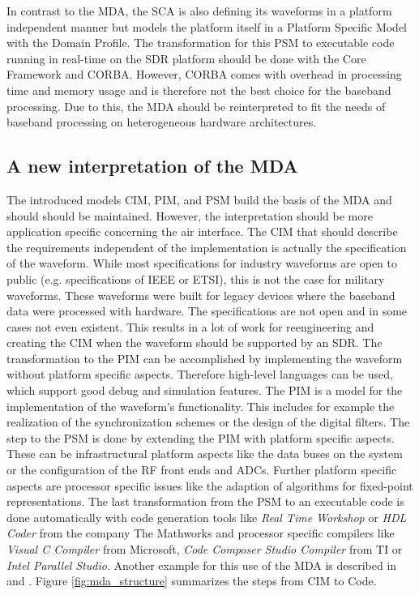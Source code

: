 In contrast to the \ac{MDA}, the \ac{SCA} is also defining its waveforms in a platform independent manner but models the platform itself in a Platform Specific Model with the Domain Profile. The transformation for this \ac{PSM} to executable code running in real-time on the SDR platform should be done with the Core Framework and \ac{CORBA}. However, \ac{CORBA} comes with overhead in processing time and memory usage and is therefore not the best choice for the baseband processing. Due to this, the MDA should be reinterpreted to fit the needs of baseband processing on heterogeneous hardware architectures.

\subsection{A new interpretation of the MDA} 
The introduced models \ac{CIM}, \ac{PIM}, and \ac{PSM} build the basis of the \ac{MDA} and should should be maintained. However, the interpretation should be more application specific concerning the air interface. The \ac{CIM} that should describe the requirements independent of the implementation is actually the specification of the waveform. While most specifications for industry waveforms are open to public (e.g. specifications of \ac{IEEE} or \ac{ETSI}), this is not the case for military waveforms. These waveforms were built for legacy devices where the baseband data were processed with hardware. The specifications are not open and in some cases not even existent. This results in a lot of work for reengineering and creating the \ac{CIM} when the waveform should be supported by an SDR. The transformation to the \ac{PIM} can be accomplished by implementing the waveform without platform specific aspects. Therefore high-level languages can be used, which support good debug and simulation features. The \ac{PIM} is a model for the implementation of the waveform's functionality. This includes for example the realization of the synchronization schemes or the design of the digital filters. The step to the \ac{PSM} is done by extending the \ac{PIM} with platform specific aspects. These can be infrastructural platform aspects like the data buses on the system or the configuration of the RF front ends and \acp{ADC}. Further platform specific aspects are processor specific issues like the adaption of algorithms for fixed-point representations. The last transformation from the \ac{PSM} to an executable code is done automatically with code generation tools like \emph{Real Time Workshop} or \emph{HDL Coder} from the company The Mathworks and processor specific compilers like \emph{Visual C Compiler} from Microsoft, \emph{Code Composer Studio Compiler} from \ac{TI} or \emph{Intel Parallel Studio}. Another example for this use of the \ac{MDA} is described in \cite{schober_mda} and \cite{nagel_tetra}. Figure \ref{fig:mda_structure} summarizes the steps from CIM to Code.
